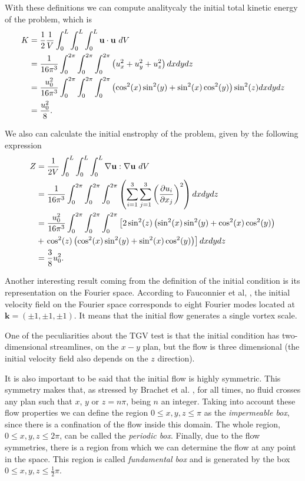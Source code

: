 With these definitions we can compute analitycaly the initial total kinetic energy of the problem, which is 
\begin{align}
\label{eq-TGV_initial_energy}
K&=\frac{1}{2}\frac{1}{V}\int_0^L\int_0^L\int_0^L\u\cdot\u\ dV\\\nonumber
&=\frac{1}{16\pi^3}\int_0^{2\pi}\int_0^{2\pi}\int_0^{2\pi}\left(u_x^2+u_y^2+u_z^2\right)dxdydz\\\nonumber
&=\frac{u_0^2}{16\pi^3}\int_0^{2\pi}\int_0^{2\pi}\int_0^{2\pi}\left(\cos^2(x)\sin^2(y)+\sin^2(x)\cos^2(y)\right)\sin^2(z)dxdydz\\\nonumber
&=\frac{u_0^2}{8}.
\end{align}

We also can calculate the initial enstrophy of the problem, given by the following expression
\begin{align}
\label{eq-TGV_wnstrophy}
Z&=\frac{1}{2V}\int_0^L\int_0^L\int_0^L\nabla\u:\nabla\u\ dV\\\nonumber
&=\frac{1}{16\pi^3}\int_0^{2\pi}\int_0^{2\pi}\int_0^{2\pi}\left(\sum_{i=1}^3\sum_{j=1}^3\left(\frac{\partial u_i}{\partial x_j}\right)^2\right)dxdydz\\\nonumber
&=\frac{u_0^2}{16\pi^3}\int_0^{2\pi}\int_0^{2\pi}\int_0^{2\pi}\left[2\sin^2(z)\left(\sin^2(x)\sin^2(y)+\cos^2(x)\cos^2(y)\right)\right.\\\nonumber
&+\left.\cos^2(z)\left(\cos^2(x)\sin^2(y)+\sin^2(x)\cos^2(y)\right)\right]dxdydz\\\nonumber
&=\frac{3}{8}u_0^2.
\end{align}

Another interesting result coming from the definition of the initial condition  is its representation on the Fourier space. According to Fauconnier et al, \cite{fauconnier_construction_2009}, the initial velocity field on the Fourier space corresponds to eight Fourier modes located at $\mathbf{k}=(\pm1,\pm1,\pm1)$. It means that the initial flow generates a single  vortex scale.

One of the peculiarities about the TGV test is that the initial condition has two-dimensional streamlines, on the $x-y$ plan, but the flow is three dimensional (the initial velocity field also depends on the $z$ direction). 

It is also important to be said that the initial flow is highly symmetric. This symmetry makes that, as stressed by Brachet et al. \cite{brachet_small-scale_1983}, for all times, no fluid crosses any plan such that $x$, $y$ or $z=n\pi$, being $n$ an integer. Taking into account these flow properties we can define the region $0\leq x,y,z\leq\pi$ as the \textit{impermeable box}, since there is a confination of the flow inside this domain. The whole region, $0\leq x,y,z\leq2\pi$, can be called the \textit{periodic box}. Finally, due to the flow symmetries, there is a region from which we can determine the flow at any point in the space. This region is called \textit{fundamental box} and is generated by the box $0\leq x,y,z\leq\frac{1}{2}\pi$.

